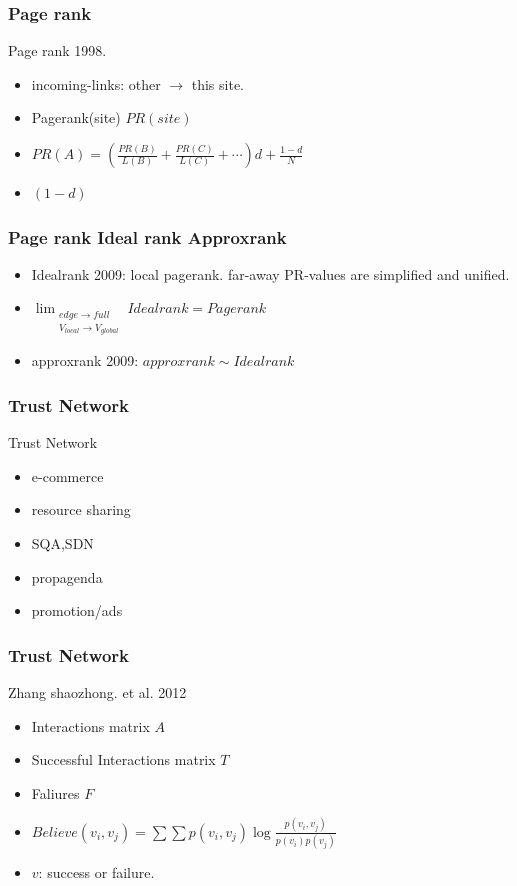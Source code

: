 \documentclass[professionalfonts]{beamer}
\begin{document}
\begin{frame}
\frametitle{Page rank}
Page rank 1998.
\begin{itemize}
\item incoming-links: other $\rightarrow$ this site.
\item Pagerank(site) $PR(site)$
\item $PR(A)=\left( \frac{PR(B)}{L(B)} + \frac{PR(C)}{L(C)} + \cdots \right)d + \frac{1-d}{N}$
\item $(1-d)$
\end{itemize}
\end{frame}

\begin{frame}
\frametitle{Page rank Ideal rank Approxrank}
\begin{itemize}
\item Idealrank 2009: local pagerank. far-away PR-values are simplified and unified.
\item $\lim_{\substack{edge \rightarrow full \\ V_{local} \rightarrow V_{global} } } Idealrank= Pagerank$
\item approxrank 2009:  $approxrank \sim Idealrank$
\end{itemize}
\end{frame}

\begin{frame}
\frametitle{Trust Network}
Trust Network
\begin{itemize}
\item e-commerce
\item resource sharing
\item SQA,SDN
\item propagenda
\item promotion/ads
\end{itemize}
\end{frame}

\begin{frame}
\frametitle{Trust Network}
Zhang shaozhong. et al.  2012
\begin{itemize}
\item Interactions matrix $A$
\item Successful Interactions matrix $T$
\item Faliures $F$
\item $Believe(v_i,v_j)=\sum \sum p(v_i,v_j) \log \frac{p(v_i,v_j)}{p(v_i)p(v_j)} $
\item $v$: success or failure.
\end{itemize}
\end{frame}
\end{document}
